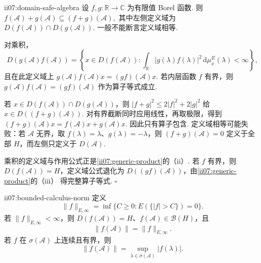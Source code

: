 \begin{FAProposition}[B][定义域安全的和与积]{ii07:domain-safe-algebra}
设 \(\displaystyle f,g:\mathbb R\to\mathbb C\) 为有限值 Borel 函数. 则
\(\displaystyle f(\mathcal A)+g(\mathcal A) \subseteq (f+g)(\mathcal A),\)
其中左侧定义域为 \(\displaystyle D(f(\mathcal A))\cap D(g(\mathcal A))\). 一般不能断言定义域相等.

对乘积，
\[
D(g(\mathcal A)f(\mathcal A))
=
\left\{
 x\in D(f(\mathcal A)):
 \int_{\mathbb R}|g(\lambda)f(\lambda)|^2\,\mathrm{d}\mu_x^E(\lambda)<\infty
\right\},
\]
且在此定义域上
\(\displaystyle g(\mathcal A)f(\mathcal A)x=(gf)(\mathcal A)x.\)
若内层函数 \(\displaystyle f\) 有界，则
\(\displaystyle g(\mathcal A)f(\mathcal A)=(gf)(\mathcal A)\)
作为算子等式成立.
\end{FAProposition}

\begin{FAProof}
若 \(\displaystyle x\in D(f(\mathcal A))\cap D(g(\mathcal A))\)，则
\(\displaystyle |f+g|^2\leqslant2|f|^2+2|g|^2\)
给 \(\displaystyle x\in D((f+g)(\mathcal A))\). 对有界截断同时应用线性，再取极限，得到
\(\displaystyle (f+g)(\mathcal A)x=f(\mathcal A)x+g(\mathcal A)x.\)
因此只有算子包含. 定义域相等可能失败：若 \(\displaystyle\mathcal A\) 无界，取 \(\displaystyle f(\lambda)=\lambda\)、\(\displaystyle g(\lambda)=-\lambda\)，则 \(\displaystyle(f+g)(\mathcal A)=0\) 定义于全部 \(\displaystyle H\)，而左侧只定义于 \(\displaystyle D(\mathcal A)\).

乘积的定义域与作用公式正是\autoref{ii07:generic-product}的（ii）. 若 \(\displaystyle f\) 有界，则 \(\displaystyle D(f(\mathcal A))=H\)，定义域公式退化为 \(\displaystyle D((gf)(\mathcal A))\)，由\autoref{ii07:generic-product}的（iii） 得完整算子等式.
\hfill\(\square\)
\end{FAProof}

\begin{FAProposition}[B][有界部分的谱本质上确界范数]{ii07:bounded-calculus-norm}
定义
\[
\|f\|_{E,\infty}
=
\inf\{C\geqslant0:E(\{|f|>C\})=0\}.
\]
若 \(\displaystyle\|f\|_{E,\infty}<\infty\)，则 \(\displaystyle D(f(\mathcal A))=H\)、\(\displaystyle f(\mathcal A)\in\mathcal B(H)\)，且
\[
\|f(\mathcal A)\|=\|f\|_{E,\infty}.
\]
若 \(\displaystyle f\) 在 \(\displaystyle\sigma(\mathcal A)\) 上连续且有界，则
\[
\|f(\mathcal A)\|
=
\sup_{\lambda\in\sigma(\mathcal A)}|f(\lambda)|.
\]
\end{FAProposition}

